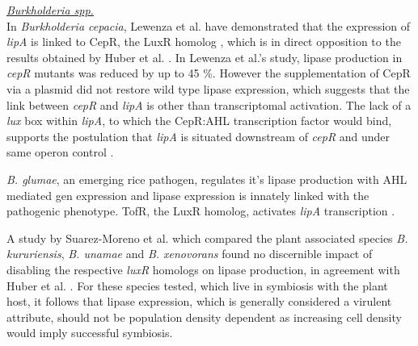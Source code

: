 \documentclass{article}
\begin{document}
\emph{\underline{Burkholderia spp.}} 
\\In \emph{Burkholderia cepacia}, Lewenza et al. have demonstrated that the expression of \emph{lipA} is linked to CepR, the LuxR homolog \cite{lewenza1999}, which is in direct opposition to the results obtained by Huber et al. \cite{huber2001}. In Lewenza et al.'s study, lipase production in \emph{cepR} mutants was reduced by up to 45 \%. However the supplementation of CepR via a plasmid did not restore wild type lipase expression, which suggests that the link between \emph{cepR} and \emph{lipA} is other than transcriptomal activation. The lack of a \emph{lux} box within \emph{lipA}, to which the CepR:AHL transcription factor would bind, supports the postulation that \emph{lipA} is situated downstream of \emph{cepR} and under same operon control \cite{lewenza1999}. 



\emph{B. glumae}, an emerging rice pathogen, regulates it's lipase production with AHL mediated gen expression and lipase expression is innately linked with the pathogenic phenotype. TofR, the LuxR homolog, activates \emph{lipA} transcription \cite{devescovi_07}. 


A study by Suarez-Moreno et al. which compared the plant associated species \emph{B. kururiensis}, \emph{B. unamae} and \emph{B. xenovorans} found no discernible impact of disabling the respective \emph{luxR} homologs on lipase production, in agreement with Huber et al. \cite{huber2001,suarez2010}. For these species tested, which live in symbiosis with the plant host, it follows that lipase expression, which is generally considered a virulent attribute, should not be population density dependent as increasing cell density would imply successful symbiosis. 
\end{document}
